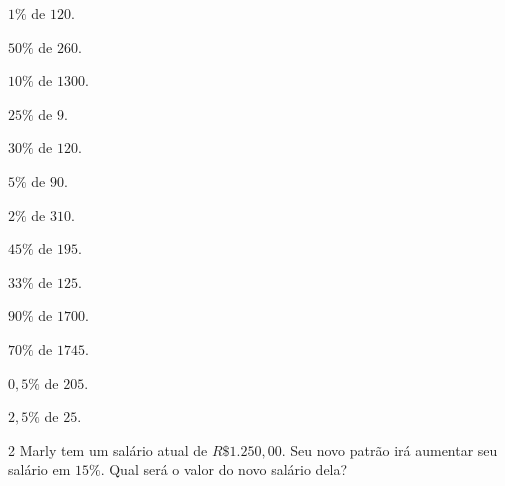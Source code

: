\begin{escolha}
\item $1\%$ de $120$.\\

\item $50\%$ de $260$.\\

\item $10\%$ de $1300$.\\

\item $25\%$ de $9$.\\

\item $30\%$ de $120$.\\

\item $5\%$ de $90$.\\

\item $2\%$ de $310$.\\

\item $45\%$ de $195$.\\

\item $33\%$ de $125$.\\

\item $90\%$ de $1700$.\\

\item $70\%$ de $1745$.\\

\item $0,5\%$ de $205$.\\

\item $2,5\%$ de $25$.\\

\end{escolha}

\num{2} Marly tem um salário atual de $R\$ 1.250,00$. Seu novo patrão irá
aumentar seu salário em $15\%$. Qual será o valor do novo salário dela?


